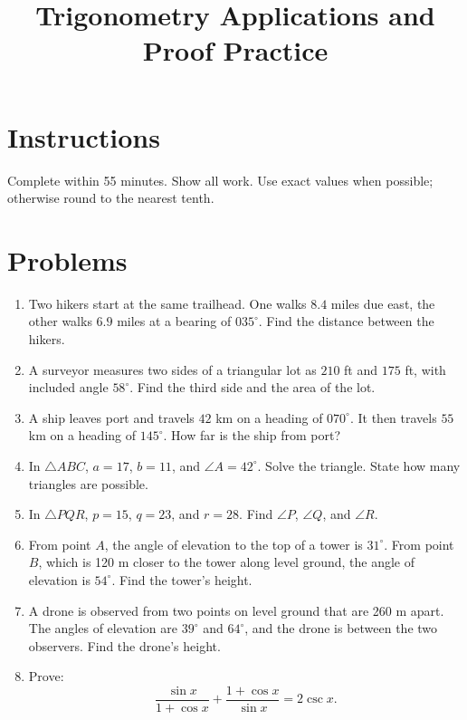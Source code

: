 \documentclass[12pt]{article}
\title{Trigonometry Applications and Proof Practice}
\author{}
\date{}
\begin{document}
\maketitle

\section*{Instructions}
Complete within 55 minutes. Show all work. Use exact values when possible; otherwise round to the nearest tenth.

\section*{Problems}
\begin{enumerate}[leftmargin=*, itemsep=0.9em]
  \item Two hikers start at the same trailhead. One walks $8.4$ miles due east, the other walks $6.9$ miles at a bearing of $035^\circ$. Find the distance between the hikers.

  \item A surveyor measures two sides of a triangular lot as $210$ ft and $175$ ft, with included angle $58^\circ$. Find the third side and the area of the lot.

  \item A ship leaves port and travels $42$ km on a heading of $070^\circ$. It then travels $55$ km on a heading of $145^\circ$. How far is the ship from port?

  \item In $\triangle ABC$, $a=17$, $b=11$, and $\angle A=42^\circ$. Solve the triangle. State how many triangles are possible.

  \item In $\triangle PQR$, $p=15$, $q=23$, and $r=28$. Find $\angle P$, $\angle Q$, and $\angle R$.

  \item From point $A$, the angle of elevation to the top of a tower is $31^\circ$. From point $B$, which is 120 m closer to the tower along level ground, the angle of elevation is $54^\circ$. Find the tower's height.

  \item A drone is observed from two points on level ground that are 260 m apart. The angles of elevation are $39^\circ$ and $64^\circ$, and the drone is between the two observers. Find the drone's height.

  \item Prove:
  \[
  \frac{\sin x}{1+\cos x}+\frac{1+\cos x}{\sin x}=2\csc x.
  \]


\end{enumerate}
\end{document}
